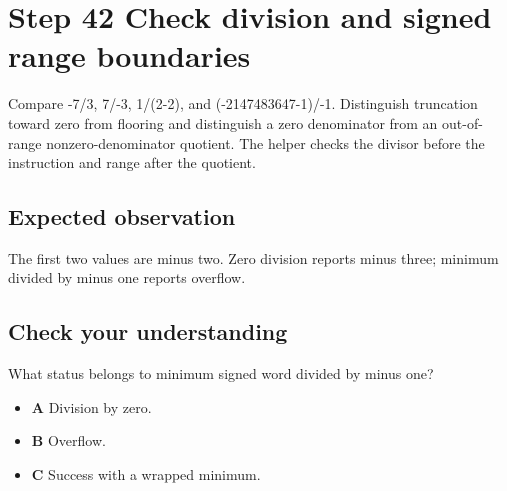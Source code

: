 \section{Step 42 Check division and signed range boundaries}\label{expression-s42}

Compare -7/3, 7/-3, 1/(2-2), and (-2147483647-1)/-1. Distinguish truncation toward zero from flooring and distinguish a zero denominator from an out-of-range nonzero-denominator quotient. The helper checks the divisor before the instruction and range after the quotient.

\subsection{Expected observation}
The first two values are minus two. Zero division reports minus three; minimum divided by minus one reports overflow.

\subsection{Check your understanding}
What status belongs to minimum signed word divided by minus one?

\begin{itemize}
  \item \textbf{A} Division by zero.
  \item \textbf{B} Overflow.
  \item \textbf{C} Success with a wrapped minimum.
\end{itemize}
